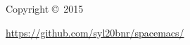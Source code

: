 \documentclass[10pt,english,landscape]{article}
\begin{document}
\begin{multicols}{3}
Copyright \copyright\ 2015


\href{https://github.com/syl20bnr/spacemacs/}{https://github.com/syl20bnr/spacemacs/}


\end{multicols}
\end{document}
